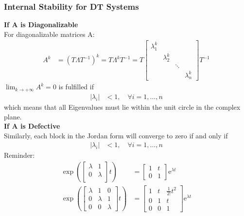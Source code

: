 \subsubsection{Internal Stability for DT Systems}
\textbf{If A is Diagonalizable}\\
For diagonalizable matrices A:
\noindent\begin{align*}
    A^k & =(T\Lambda T^{-1})^k=T\Lambda^kT^{-1}=T\begin{bmatrix}\lambda_1^k&&&\\&\lambda_2^k&&\\&&\ddots&\\&&&\lambda_n^k\end{bmatrix}T^{-1}
\end{align*}
$\lim_{k\to+\infty}A^k=0$ is fulfilled if
\noindent\begin{align*}
    |\lambda_i| & <1,\quad\forall i=1,\ldots,n
\end{align*}
which means that all Eigenvalues must lie within the unit circle in the complex plane.\\
\textbf{If A is Defective}\\
Similarly, each block in the Jordan form will converge to zero if and only if
\noindent\begin{align*}
    |\lambda_i| & <1,\quad\forall i=1,\ldots,n
\end{align*}
Reminder:
\noindent\begin{align*}
    \left.\exp\left(\begin{bmatrix}\lambda&1\\ 0&\lambda\\\end{bmatrix}\right.t\right)               & =\begin{bmatrix}1&t\\0&1\end{bmatrix}\text{e}^{\lambda t}                          \\
    \left.\exp\left(\begin{bmatrix}\lambda&1&0\\0&\lambda&1\\0&0&\lambda\end{bmatrix}\right.t\right) & =\begin{bmatrix}1&t&\frac{1}{2!}t^2\\0&1&t\\0&0&1\end{bmatrix}\text{e}^{\lambda t}
\end{align*}
%
